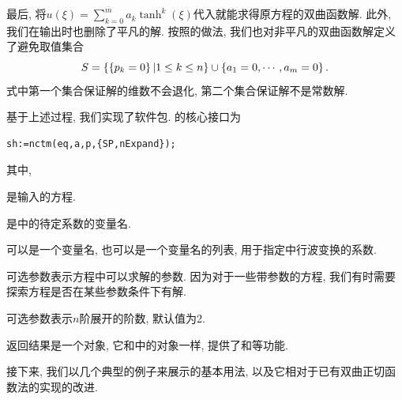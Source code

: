 最后, 将$u(\xi)=\sum_{k=0}^{\overline{m}}{a_k \tanh^k(\xi)}$代入就能求得原方程的双曲函数解.  此外, 我们在输出时也删除了平凡的解. 按照的做法, 我们也对非平凡的双曲函数解定义了避免取值集合
\begin{equation}
    S=\left\{\left\{p_k=0\right\}|1\le k \le n\right\} \cup \left\{a_1=0,\cdots,a_m=0\right\}.
\end{equation}
式中第一个集合保证解的维数不会退化, 第二个集合保证解不是常数解. 

基于上述过程, 我们实现了软件包. 的核心接口为
\begin{verbatim}
sh:=nctm(eq,a,p,{SP,nExpand});
\end{verbatim}
其中,
\begin{compactitem}[\textbullet]
\item {} 是输入的方程.
\item {} 是中的待定系数的变量名.
\item {} 可以是一个变量名, 也可以是一个变量名的列表, 用于指定中行波变换的系数.
\item 可选参数表示方程中可以求解的参数. 因为对于一些带参数的方程, 我们有时需要探索方程是否在某些参数条件下有解.
\item 可选参数表示$n$阶展开的阶数, 默认值为2.
\item 返回结果是一个对象, 它和中的对象一样, 提供了\D {}和等功能. 
\end{compactitem}

接下来, 我们以几个典型的例子来展示的基本用法, 以及它相对于已有双曲正切函数法的实现的改进. 

